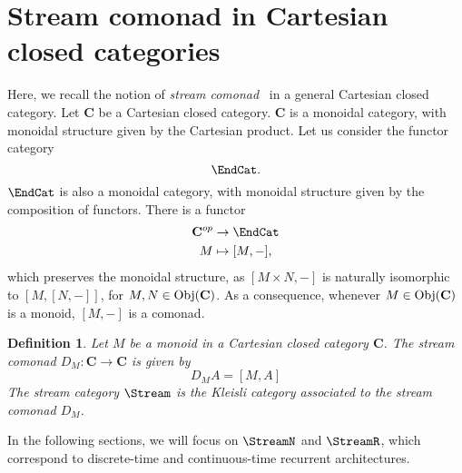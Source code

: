 \documentclass[12pt]{article}
\newtheorem{definition}{Definition}
\newcommand{\Obj}{{\textnormal{Obj}}}
\newcommand{\Cat}{{\mathbf{C}}}
\begin{document}
    \section{Stream comonad in Cartesian closed categories}
    Here, we recall the notion of {\em stream comonad}~\cite{uustaluComonadicNotionsComputation2008} in a general Cartesian closed category.
    Let $\Cat$ be a Cartesian closed category. $\Cat$ is a monoidal category, with monoidal structure given by the Cartesian product. Let us consider the functor category
    \begin{equation*}
        \EndCat.
    \end{equation*}
    $\EndCat$ is also a monoidal category, with monoidal structure given by the composition of functors. There is a functor
    \begin{align*}
        \Cat^{op} &\rightarrow \EndCat \\
        M &\mapsto [M, -],
    \end{align*}
    which preserves the monoidal structure, as $[M \times N, -]$ is naturally isomorphic to $[M, [N, -]]$, for $M, N \in \Obj(\Cat)$.
    As a consequence, whenever $M \in \Obj(\Cat)$ is a monoid, $[M, -]$ is a comonad.
    \begin{definition}\label{def:streamcomonad}\cite[Sect.~3.1]{uustaluComonadicNotionsComputation2008}
        Let $M$ be a monoid in a Cartesian closed category $\Cat$.
        The {\em stream comonad} $D_M\colon \Cat \rightarrow \Cat$ is given by
        \begin{equation*}
            D_M A = [M, A]
        \end{equation*}
        The {\em stream category} $\Stream$ is the Kleisli category associated to the stream comonad $D_M$.
    \end{definition}

    In the following sections, we will focus on $\StreamN$ and $\StreamR$, which correspond to discrete-time and continuous-time recurrent architectures.

\end{document}

